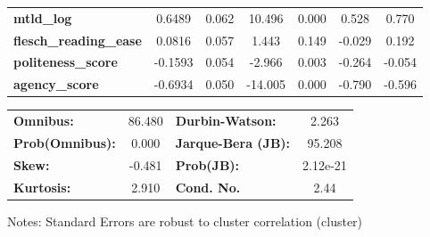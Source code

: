 \begin{center}
\begin{tabular}{lcccccc}
\textbf{mtld\_log}             &       0.6489  &        0.062     &    10.496  &         0.000        &        0.528    &        0.770     \\
\textbf{flesch\_reading\_ease} &       0.0816  &        0.057     &     1.443  &         0.149        &       -0.029    &        0.192     \\
\textbf{politeness\_score}     &      -0.1593  &        0.054     &    -2.966  &         0.003        &       -0.264    &       -0.054     \\
\textbf{agency\_score}         &      -0.6934  &        0.050     &   -14.005  &         0.000        &       -0.790    &       -0.596     \\
\bottomrule
\end{tabular}
\begin{tabular}{lclc}
\textbf{Omnibus:}       & 86.480 & \textbf{  Durbin-Watson:     } &    2.263  \\
\textbf{Prob(Omnibus):} &  0.000 & \textbf{  Jarque-Bera (JB):  } &   95.208  \\
\textbf{Skew:}          & -0.481 & \textbf{  Prob(JB):          } & 2.12e-21  \\
\textbf{Kurtosis:}      &  2.910 & \textbf{  Cond. No.          } &     2.44  \\
\bottomrule
\end{tabular}
\end{center}

Notes: \newline
 [1] Standard Errors are robust to cluster correlation (cluster)